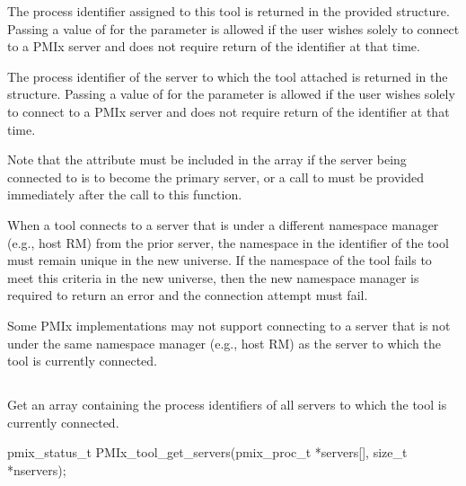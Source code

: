 The process identifier assigned to this tool is returned in the provided  structure. Passing a value of  for the  parameter is allowed if the user wishes solely to connect to a \ac{PMIx} server and does not require return of the identifier at that time.

The process identifier of the server to which the tool attached is returned in the  structure. Passing a value of  for the  parameter is allowed if the user wishes solely to connect to a \ac{PMIx} server and does not require return of the identifier at that time.

Note that the  attribute must be included in the
 array if the server being connected to is to become the primary
server, or a call to  must be provided immediately
after the call to this function.

\adviceimplstart
When a tool connects to a server that is under a different namespace manager (e.g., host \ac{RM}) from the prior server, the namespace in the identifier of the tool must remain unique in the new universe. If the namespace of the tool fails to meet this criteria in the new universe, then the new namespace manager is required to return an error and the connection attempt must fail.
\adviceimplend

\adviceuserstart
Some \ac{PMIx} implementations may not support connecting to a server that is not under the same namespace manager (e.g., host \ac{RM}) as the server to which the tool is currently connected.
\adviceuserend


\subsection{}

\summary

Get an array containing the  process identifiers of all servers to which the tool is currently connected.

\format

\cspecificstart
\begin{codepar}
pmix_status_t
PMIx_tool_get_servers(pmix_proc_t *servers[], size_t *nservers);
\end{codepar}
\cspecificend

\begin{arglist}
\end{arglist}

